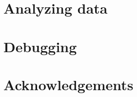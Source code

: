 \section{Analyzing data}
\label{sec:data}


\section{Debugging}
\label{sec:debugging}


\section{Acknowledgements}

\begin{thebibliography}{9}
\end{thebibliography}


